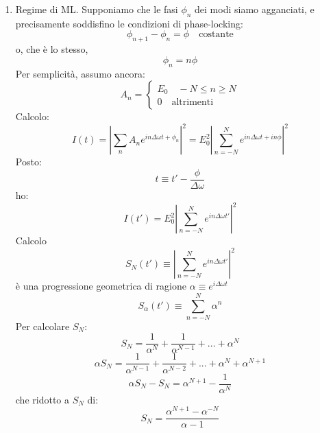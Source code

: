 \documentclass{book}
\def \D {\Delta}
\theoremstyle{remark}
\begin{document}
\begin{enumerate}
\item Regime di ML. Supponiamo che le fasi $\phi_n$ dei modi siamo agganciati, e precisamente soddisfino le condizioni di phase-locking:
\begin{equation*}
\phi_{n+1} - \phi_n = \phi \quad \text{costante}
\end{equation*}
o, che è lo stesso,
\begin{equation*}
\phi_n = n\phi
\end{equation*}
Per semplicità, assumo ancora:
\begin{equation*}
A_n = \begin{cases}
E_0 \quad -N\leq n \geq N\\
0 \quad \text{altrimenti}
\end{cases}
\end{equation*}
Calcolo:
\begin{equation*}
I(t) = \left| \sum_n A_n e^{in\D\omega t + \phi_n} \right|^2 = E_0^2 \left| \sum_{n=-N}^N e^{in\D\omega t + i n\phi} \right|^2
\end{equation*}
Posto:
\begin{equation*}
t \equiv t'-\frac{\phi}{\D\omega}
\end{equation*}
ho:
\begin{equation*}
I(t') = E_0^2 \left| \sum_{n=-N}^N e^{in\D\omega t'} \right|^2
\end{equation*}
Calcolo
\begin{equation*}
S_N(t') \equiv \left| \sum_{n=-N}^N e^{in\D\omega t'} \right|^2
\end{equation*}
è una progressione geometrica di ragione $\alpha \equiv e^{i\D\omega t}$
\begin{equation*}
S_\alpha(t') \equiv \sum_{n=-N}^N \alpha^n
\end{equation*}
Per calcolare $S_N$:
\begin{equation*}
S_N = \frac{1}{\alpha^N} + \frac{1}{\alpha^{N-1}} + ... +\alpha^N
\end{equation*}
\begin{equation*}
\alpha S_N = \frac{1}{\alpha^{N-1}} + \frac{1}{\alpha^{N-2}} + ... + \alpha^N + \alpha^{N+1}
\end{equation*}
\begin{equation*}
\alpha S_N - S_N = \alpha^{N+1} - \frac{1}{\alpha^N}
\end{equation*}
che ridotto a $S_N$ di:
\begin{equation*}
S_N = \frac{\alpha^{N+1} - \alpha^{-N}}{\alpha - 1}
\end{equation*}

\end{enumerate}
\end{document}
